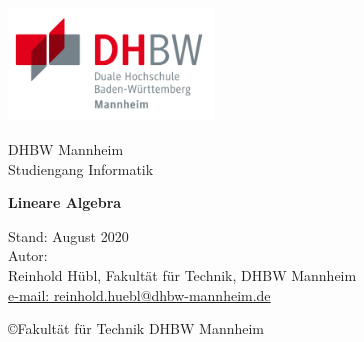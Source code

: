 



\begin{titlepage}
\hfill
\includegraphics[height=3cm]{DHBWlogo}
\vfill
\parindent 0pt

    \large DHBW Mannheim \\
    \large {Studiengang Informatik}\\
 
       \vspace{1cm}
    {\Huge\bfseries  Lineare Algebra  \par}

\vfill 
\small  Stand: August 2020 \\ 
\small Autor:\\ 
Reinhold Hübl, Fakultät für Technik, DHBW Mannheim \\
\url{e-mail: reinhold.huebl@dhbw-mannheim.de} 
\vspace{1cm}

\copyright Fakultät für Technik DHBW Mannheim 

\end{titlepage}